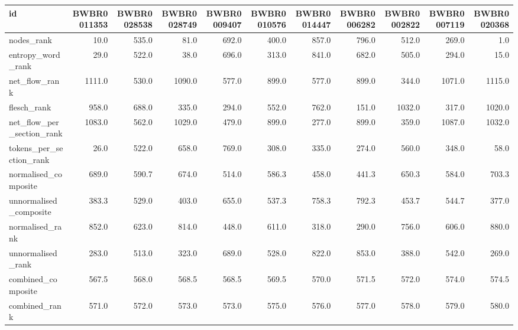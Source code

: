 \begin{tabular}{lrrrrrrrrrr}
\toprule
id & BWBR0011353 & BWBR0028538 & BWBR0028749 & BWBR0009407 & BWBR0010576 & BWBR0014447 & BWBR0006282 & BWBR0002822 & BWBR0007119 & BWBR0020368 \\
\midrule
nodes\_rank & 10.0 & 535.0 & 81.0 & 692.0 & 400.0 & 857.0 & 796.0 & 512.0 & 269.0 & 1.0 \\
\cline{1-11}
entropy\_word\_rank & 29.0 & 522.0 & 38.0 & 696.0 & 313.0 & 841.0 & 682.0 & 505.0 & 294.0 & 15.0 \\
\cline{1-11}
net\_flow\_rank & 1111.0 & 530.0 & 1090.0 & 577.0 & 899.0 & 577.0 & 899.0 & 344.0 & 1071.0 & 1115.0 \\
\cline{1-11}
flesch\_rank & 958.0 & 688.0 & 335.0 & 294.0 & 552.0 & 762.0 & 151.0 & 1032.0 & 317.0 & 1020.0 \\
\cline{1-11}
net\_flow\_per\_section\_rank & 1083.0 & 562.0 & 1029.0 & 479.0 & 899.0 & 277.0 & 899.0 & 359.0 & 1087.0 & 1032.0 \\
\cline{1-11}
tokens\_per\_section\_rank & 26.0 & 522.0 & 658.0 & 769.0 & 308.0 & 335.0 & 274.0 & 560.0 & 348.0 & 58.0 \\
\cline{1-11}
normalised\_composite & 689.0 & 590.7 & 674.0 & 514.0 & 586.3 & 458.0 & 441.3 & 650.3 & 584.0 & 703.3 \\
\cline{1-11}
unnormalised\_composite & 383.3 & 529.0 & 403.0 & 655.0 & 537.3 & 758.3 & 792.3 & 453.7 & 544.7 & 377.0 \\
\cline{1-11}
normalised\_rank & 852.0 & 623.0 & 814.0 & 448.0 & 611.0 & 318.0 & 290.0 & 756.0 & 606.0 & 880.0 \\
\cline{1-11}
unnormalised\_rank & 283.0 & 513.0 & 323.0 & 689.0 & 528.0 & 822.0 & 853.0 & 388.0 & 542.0 & 269.0 \\
\cline{1-11}
combined\_composite & 567.5 & 568.0 & 568.5 & 568.5 & 569.5 & 570.0 & 571.5 & 572.0 & 574.0 & 574.5 \\
\cline{1-11}
combined\_rank & 571.0 & 572.0 & 573.0 & 573.0 & 575.0 & 576.0 & 577.0 & 578.0 & 579.0 & 580.0 \\
\cline{1-11}
\bottomrule
\end{tabular}
